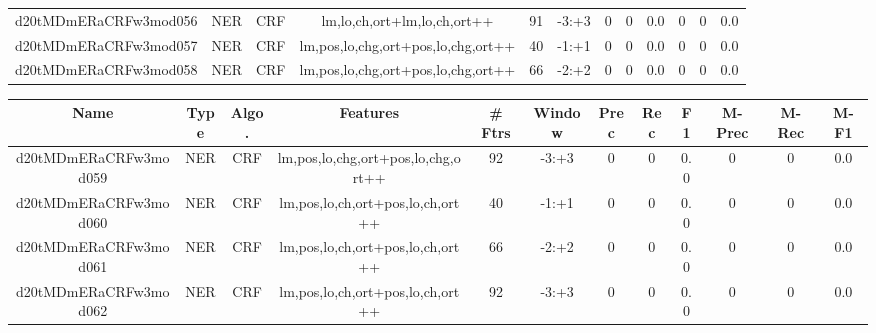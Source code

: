 \documentclass[a4paper]{article}
\begin{document}
\begin{landscape}
\begin{center}
\begin{tabular}{ |c|c|c|c|c|c|c|c|c|c|c|c|}
 
 	
 	\small{ d20tMDmERaCRFw3mod056 } & \small{ NER} & \small{  CRF }  & lm,lo,ch,ort+lm,lo,ch,ort++  &  91 &  \small{  -3:+3 }  &  0 & 0 & 0.0  &  0 & 0 & 0.0 \\
 	

 
 	
 	\small{ d20tMDmERaCRFw3mod057 } & \small{ NER} & \small{  CRF }  & lm,pos,lo,chg,ort+pos,lo,chg,ort++  &  40 &  \small{  -1:+1 }  &  0 & 0 & 0.0  &  0 & 0 & 0.0 \\
 	

 
 	
 	\small{ d20tMDmERaCRFw3mod058 } & \small{ NER} & \small{  CRF }  & lm,pos,lo,chg,ort+pos,lo,chg,ort++  &  66 &  \small{  -2:+2 }  &  0 & 0 & 0.0  &  0 & 0 & 0.0 \\
 	
 \hline
\end{tabular}
\end{center}




\begin{center}
\begin{tabular}{ |c|c|c|c|c|c|c|c|c|c|c|c|} 
 \hline
 	Name & Type & Algo. & Features & \# Ftrs & Window & Prec & Rec & F1 & M-Prec & M-Rec & M-F1\\
 \hline

 	

 
 	
 	\small{ d20tMDmERaCRFw3mod059 } & \small{ NER} & \small{  CRF }  & lm,pos,lo,chg,ort+pos,lo,chg,ort++  &  92 &  \small{  -3:+3 }  &  0 & 0 & 0.0  &  0 & 0 & 0.0 \\
 	

 
 	
 	\small{ d20tMDmERaCRFw3mod060 } & \small{ NER} & \small{  CRF }  & lm,pos,lo,ch,ort+pos,lo,ch,ort++  &  40 &  \small{  -1:+1 }  &  0 & 0 & 0.0  &  0 & 0 & 0.0 \\
 	

 
 	
 	\small{ d20tMDmERaCRFw3mod061 } & \small{ NER} & \small{  CRF }  & lm,pos,lo,ch,ort+pos,lo,ch,ort++  &  66 &  \small{  -2:+2 }  &  0 & 0 & 0.0  &  0 & 0 & 0.0 \\
 	

 
 	
 	\small{ d20tMDmERaCRFw3mod062 } & \small{ NER} & \small{  CRF }  & lm,pos,lo,ch,ort+pos,lo,ch,ort++  &  92 &  \small{  -3:+3 }  &  0 & 0 & 0.0  &  0 & 0 & 0.0 \\
 	


\end{tabular}
\end{center}
\end{landscape}
\end{document}
